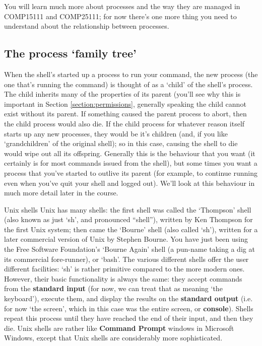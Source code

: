 You will learn much more about processes and the way they are managed in COMP15111 and COMP25111; for now there's one more thing you need to understand about the relationship between processes. 

\subsection{The process `family tree'}
\label{section:family-tree}

When the shell's started up a process to run your command, the new process (the one that's running the command) is thought of as a `child' of the shell's process. The child inherits many of the properties of its parent (you'll see why this is important in Section \ref{section:permissions}, generally speaking the child cannot exist without its parent. If something caused the parent process to abort, then the child process would also die. If the child process for whatever reason itself starts up any new processes, they would be it's children (and, if you like `grandchildren' of the original shell); so in this case, causing the shell to die would wipe out all its offspring. Generally this is the behaviour that you want (it certainly is for most commands issued from the shell), but some times you want a process that you've started to outlive its parent (for example, to continue running even when you've quit your shell and logged out). We'll look at this behaviour in much more detail later in the course.


\begin{diversion}{Unix shells}
Unix has many shells: the first shell was called the `Thompson' shell (also known as just `sh', and pronounced ``shell''), written by Ken Thompson for the first Unix system; then came the `Bourne' shell (also called `sh'), written for a later commercial version of Unix by Stephen Bourne. You have just been using the Free Software Foundation's `Bourne Again' shell (a pun-name taking a dig at its commercial fore-runner), or `bash'. The various different shells offer the user different facilities: `sh' is rather
primitive compared to the more modern ones. However, their basic
functionality is always the same: they accept commands from the
\textbf{standard input} (for now, we can treat that as meaning `the keyboard'), execute them, and display
the results on the \textbf{standard output} (i.e. for now `the screen', which in
this case was the entire screen, or \textbf{console}). Shells repeat
this process until they have reached the end of their input, and then
they die. Unix shells are rather like \textbf{Command Prompt} windows in Microsoft
Windows, except that Unix shells are considerably more sophisticated.
\end{diversion}



